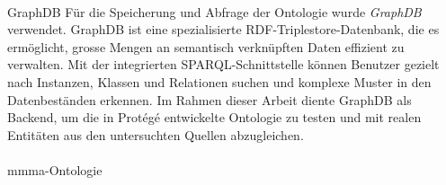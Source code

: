 \documentclass[12pt, a4paper, ngerman, bidi=default]{article}
\makeatletter
\let\oldparagraph\paragraph%
\renewcommand{\paragraph}{
    \@ifstar%
      \xxxParagraphStar%
      \xxxParagraphNoStar%
 }
\newcommand{\xxxParagraphStar}[1]{\oldparagraph*{#1}\mbox{}}
\newcommand{\xxxParagraphNoStar}[1]{\oldparagraph{#1}\mbox{}}
\makeatother
\begin{document}
\paragraph{GraphDB} Für die Speicherung und Abfrage der Ontologie wurde \textit{GraphDB} verwendet. 
GraphDB ist eine spezialisierte RDF-Triplestore-Datenbank, die es ermöglicht, 
grosse Mengen an semantisch verknüpften Daten effizient zu verwalten. 
Mit der integrierten SPARQL-Schnittstelle können Benutzer gezielt nach Instanzen, Klassen und Relationen suchen 
und komplexe Muster in den Datenbeständen erkennen. 
Im Rahmen dieser Arbeit diente GraphDB als Backend, um die in Protégé entwickelte Ontologie zu testen 
und mit realen Entitäten aus den untersuchten Quellen abzugleichen.


\paragraph{mmma-Ontologie}\\
\end{document}
